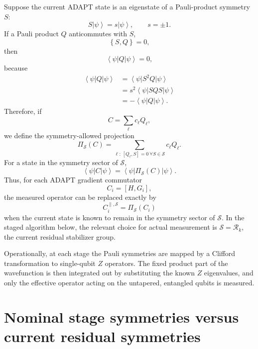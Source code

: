 \documentclass[11pt]{article}
\newcommand{\ket}[1]{\left|#1\right\rangle}
\newcommand{\bra}[1]{\left\langle#1\right|}
\newcommand{\acomm}[2]{\left\{#1,#2\right\}}
\newcommand{\mc}[1]{\mathcal{#1}}
\begin{document}
Suppose the current ADAPT state is an eigenstate of a Pauli-product symmetry $S$:
\begin{equation}
    S\ket{\psi}=s\ket{\psi},\qquad s=\pm 1.
\end{equation}
If a Pauli product $Q$ anticommutes with $S$,
\begin{equation}
    \acomm{S}{Q}=0,
\end{equation}
then
\begin{equation}
    \bra{\psi}Q\ket{\psi}=0,
\end{equation}
because
\begin{align}
    \bra{\psi}Q\ket{\psi}
    &= \bra{\psi}S^2 Q\ket{\psi} \\
    &= s^2 \bra{\psi}SQS\ket{\psi} \\
    &= -\bra{\psi}Q\ket{\psi}.
\end{align}
Therefore, if
\begin{equation}
    C=\sum_\ell c_\ell Q_\ell,
\end{equation}
we define the symmetry-allowed projection
\begin{equation}
    \Pi_{\mc S}(C)
    = \sum_{\ell:\,[Q_\ell,S]=0\ \forall S\in\mc S} c_\ell Q_\ell.
\end{equation}
For a state in the symmetry sector of $\mc S$,
\begin{equation}
    \bra{\psi}C\ket{\psi}
    = \bra{\psi}\Pi_{\mc S}(C)\ket{\psi}.
\end{equation}
Thus, for each ADAPT gradient commutator
\begin{equation}
    C_i=[H,G_i],
\end{equation}
the measured operator can be replaced exactly by
\begin{equation}
    C_i^{\parallel,\mc S}=\Pi_{\mc S}(C_i)
\end{equation}
when the current state is known to remain in the symmetry sector of $\mc S$. In the staged algorithm below, the relevant choice for actual measurement is $\mc S=\mathcal R_k$, the current residual stabilizer group.

Operationally, at each stage the Pauli symmetries are mapped by a Clifford transformation to single-qubit $Z$ operators. The fixed product part of the wavefunction is then integrated out by substituting the known $Z$ eigenvalues, and only the effective operator acting on the untapered, entangled qubits is measured.

\section{Nominal stage symmetries versus current residual symmetries}
\label{sec:residual}
\end{document}
